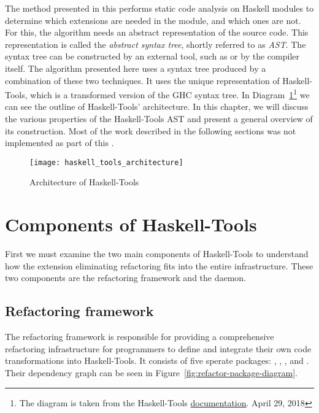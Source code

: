 \documentclass[main.tex]{subfiles}
\begin{document}
	
	The method presented in this \paper{} performs static code analysis on Haskell modules to determine which extensions are needed in the module, and which ones are not. For this, the algorithm needs an abstract representation of the source code. This representation is called the \emph{abstract syntax tree}, shortly referred to as \emph{AST}. The syntax tree can be constructed by an external tool, such as \cite{haskell-src-exts} or by the compiler itself. The algorithm presented here uses a syntax tree produced by a combination of these two techniques. It uses the unique representation of Haskell-Tools, which is a transformed version of the GHC syntax tree. In Diagram~\ref{fig:haskell-tools-architecture}\footnote{The diagram is taken from the Haskell-Tools \href{https://github.com/haskell-tools/haskell-tools/blob/master/documentation/haskell_tools_architecture.png}{documentation}. April 29, 2018 } we can see the outline of Haskell-Tools' architecture. In this chapter, we will discuss the various properties of the Haskell-Tools AST and present a general overview of its construction. Most of the work described in the following sections was not implemented as part of this \paper{}. 
	
	\begin{figure}[H]
		\renewcommand{\figurename}{Diagram}
		\hspace{-1cm}
		\centering
		\caption{Architecture of Haskell-Tools}
		\texttt{[image: haskell\_tools\_architecture]}
		\label{fig:haskell-tools-architecture}
	\end{figure}
	
	\newpage
	
	\section{Components of Haskell-Tools}
	
	First we must examine the two main components of Haskell-Tools to understand how the extension eliminating refactoring fits into the entire infrastructure. These two components are the refactoring framework and the daemon.
	
	\subsection{Refactoring framework}
	
	The refactoring framework is responsible for providing a comprehensive refactoring infrastructure for programmers to define and integrate their own code transformations into Haskell-Tools. It consists of five sperate packages: , , ,  and . Their dependency graph can be seen in Figure~\ref{fig:refactor-package-diagram}.
	
\end{document}
